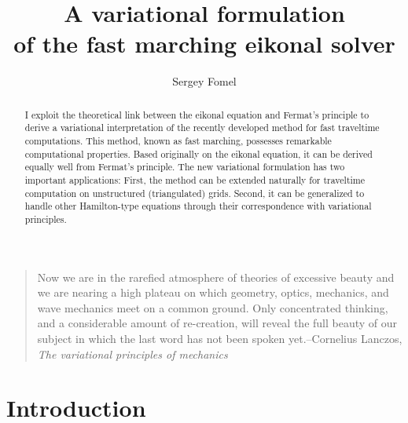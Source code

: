 \title{A variational formulation \\ of the fast marching eikonal solver}


\author{Sergey Fomel}

\maketitle

\begin{abstract}
  I exploit the theoretical link between the eikonal equation and
  Fermat's principle to derive a variational interpretation of the
  recently developed method for fast traveltime computations. This
  method, known as fast marching, possesses remarkable computational
  properties. Based originally on the eikonal equation, it can be
  derived equally well from Fermat's principle.  The new variational
  formulation has two important applications: First, the method can be
  extended naturally for traveltime computation on unstructured
  (triangulated) grids. Second, it can be generalized to handle other
  Hamilton-type equations through their correspondence with
  variational principles.
\end{abstract}

\footnotesize
 \begin{quote}
   Now we are in the rarefied atmosphere of theories of excessive
   beauty and we are nearing a high plateau on which geometry, optics,
   mechanics, and wave mechanics meet on a common ground. Only
   concentrated thinking, and a considerable amount of re-creation,
   will reveal the full beauty of our subject in which the last word
   has not been spoken yet.--Cornelius Lanczos, \emph{The variational
     principles of mechanics}
 \end{quote}
\normalsize

\section{Introduction}

